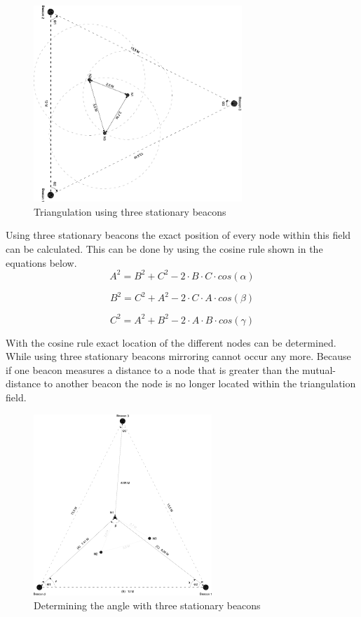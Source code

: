 \documentclass[10pt,a4paper]{article}
\begin{document}
\begin{figure}[H]
\centering
\includegraphics[angle=90,width=0.7\textwidth]{driehoek.pdf}
\caption{Triangulation using three stationary beacons}
\label{driehoek}
\end{figure}

Using three stationary beacons the exact position of every node within this field can be calculated. This can be done by using the cosine rule shown in the equations below. 
\begin{equation}
A^2 = B^2 + C^2 - 2\cdot B\cdot C\cdot cos(\alpha)
\end{equation}

\begin{equation}
B^2 = C^2 + A^2 - 2\cdot C\cdot A\cdot cos(\beta)
\end{equation}

\begin{equation}
C^2 = A^2 + B^2 - 2\cdot A\cdot B\cdot cos(\gamma)
\end{equation}

With the cosine rule exact location of the different nodes can be determined. While using three stationary beacons mirroring cannot occur any more. Because if one beacon measures a distance to a node that is greater than the mutual-distance to another beacon the node is no longer located within the triangulation field.

\begin{figure}[H]
\centering
\includegraphics[width=0.6\textwidth]{triangulatie.pdf}
\caption{Determining the angle with three stationary beacons}
\label{triangulatie}
\end{figure}
\end{document}
